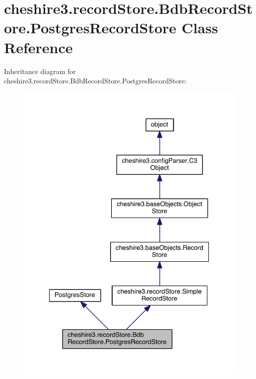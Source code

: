 \hypertarget{classcheshire3_1_1record_store_1_1_bdb_record_store_1_1_postgres_record_store}{\section{cheshire3.\-record\-Store.\-Bdb\-Record\-Store.\-Postgres\-Record\-Store Class Reference}
\label{classcheshire3_1_1record_store_1_1_bdb_record_store_1_1_postgres_record_store}
}


Inheritance diagram for cheshire3.\-record\-Store.\-Bdb\-Record\-Store.\-Postgres\-Record\-Store\-:
\nopagebreak
\begin{figure}[H]
\begin{center}
\leavevmode
\includegraphics[width=328pt]{classcheshire3_1_1record_store_1_1_bdb_record_store_1_1_postgres_record_store__inherit__graph}
\end{center}
\end{figure}


